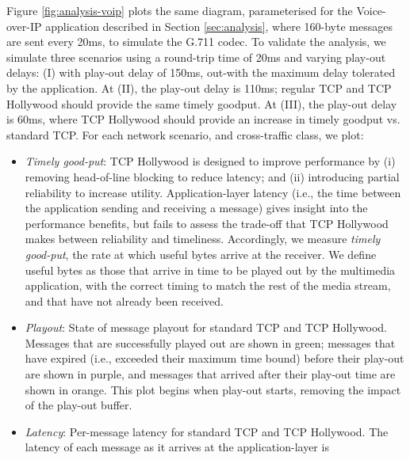 Figure \ref{fig:analysis-voip} plots the same diagram, parameterised for the
Voice-over-IP application described in Section \ref{sec:analysis}, where
160-byte messages are sent every 20ms, to simulate the G.711 codec.
To validate the analysis, we simulate three scenarios using a round-trip time of
20ms and varying play-out delays:
(I) with play-out delay of
150ms, out-with the maximum delay tolerated by the application. At (II), the play-out delay
is 110ms; regular TCP and TCP Hollywood should provide the same timely goodput. At (III),
the play-out delay is 60ms, where TCP Hollywood should provide an increase in timely
goodput vs. standard TCP.
For each network scenario, and cross-traffic class, we plot:
\begin{itemize}
\item \emph{Timely good-put}:
                    TCP Hollywood is designed to improve performance by (i)
                    removing head-of-line blocking to reduce
                    latency; and (ii) introducing partial reliability to
                    increase utility.  Application-layer
                    latency (i.e., the time between the application sending
                    and receiving a message) gives insight into the
                    performance benefits, but fails to assess the trade-off
                    that TCP Hollywood makes between reliability and
                    timeliness.  Accordingly, we measure \emph{timely
                    good-put}, the rate at which useful bytes arrive at
                    the receiver. We define useful bytes as those that
                    arrive in time to be played out by the multimedia
                    application, with the correct timing to match the rest
                    of the media stream, and that have not already been
                    received.
\item \emph{Playout}: State of message playout for standard TCP and TCP Hollywood.
                    Messages that are successfully played out are shown in green; messages
                    that have expired (i.e., exceeded their maximum time bound) before their
                    play-out are shown in purple, and messages that arrived after their
                    play-out time are shown in orange. This plot begins when play-out starts,
                    removing the impact of the play-out buffer.
\item \emph{Latency}: Per-message latency for standard TCP and TCP Hollywood.
                    The latency of each message as it arrives at the application-layer is

\end{itemize}
